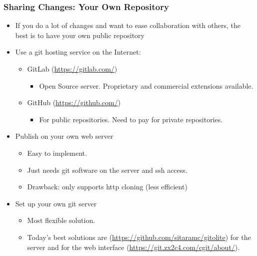 \begin{frame}
  \frametitle{Sharing Changes: Your Own Repository}
  \begin{itemize}
  \item If you do a lot of changes and want to ease collaboration with
    others, the best is to have your own public repository
  \item Use a git hosting service on the Internet:
    \begin{itemize}
    \item GitLab (\url{https://gitlab.com/})
      \begin{itemize}
      \item Open Source server. Proprietary and commercial extensions
       available.
      \end{itemize}
    \item GitHub (\url{https://github.com/})
      \begin{itemize}
      \item For public repositories. Need to pay for private
        repositories.
      \end{itemize}
    \end{itemize}
  \item Publish on your own web server
    \begin{itemize}
    \item Easy to implement.
    \item Just needs git software on the server and ssh access.
    \item Drawback: only supports http cloning (less efficient)
    \end{itemize}
  \item Set up your own git server
    \begin{itemize}
    \item Most flexible solution.
    \item Today's best solutions are 
      (\url{https://github.com/sitaramc/gitolite}) for the server and
       for the web interface
      (\url{https://git.zx2c4.com/cgit/about/}).
    \end{itemize}
  \end{itemize}
\end{frame}

